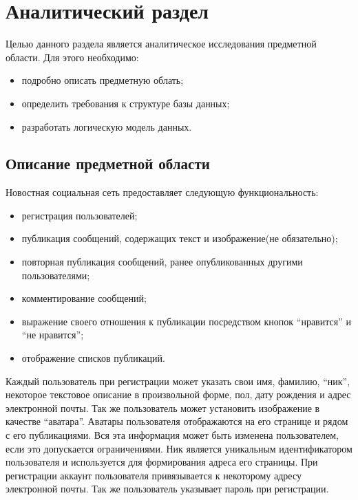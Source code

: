 \chapter{Аналитический раздел}
\label{cha:analysis}
%
%

Целью данного раздела является аналитическое исследования предметной области.
Для этого необходимо:
\begin{itemize}
\item подробно описать предметную облать;
\item определить требования к структуре базы данных;
\item разработать логическую модель данных.
\end{itemize}

\section{Описание предметной области}


Новостная социальная сеть предоставляет следующую функциональность:
\begin{itemize}
\item регистрация пользователей;
\item публикация сообщений, содержащих текст и изображение(не обязательно);
\item повторная публикация сообщений, ранее опубликованных другими пользователями;
\item комментирование сообщений;
\item выражение своего отношения к публикации посредством кнопок ``нравится'' и ``не нравится'';
\item отображение списков публикаций.
\end{itemize}

Каждый пользователь при регистрации может указать свои имя,
фамилию, ``ник'', некоторое текстовое описание в произвольной форме, пол,
дату рождения и адрес электронной почты.
Так же пользователь может установить изображение в качестве ``аватара''.
Аватары пользователя отображаются на его странице и рядом с его публикациями.
Вся эта информация может быть изменена пользователем,
если это допускается ограничениями.
Ник является уникальным идентификатором пользователя 
и используется для формирования адреса его страницы.
При регистрации аккаунт пользователя привязывается к некоторому адресу электронной
почты.
Так же пользователь указывает пароль при регистрации.


